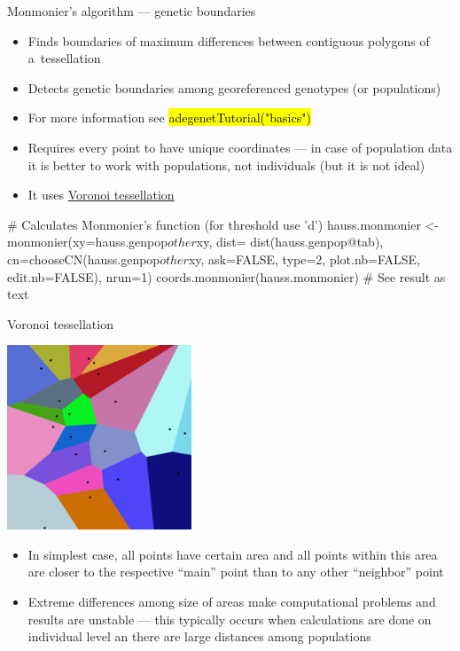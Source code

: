 \documentclass[compress, ucs, xelatex, 11pt, xcolor=svgnames,
	hyperref={
		bookmarks=true,
		unicode=true,
		colorlinks=true,
		pdftitle={Molecular data in R},
		plainpages=false,
		pdfauthor={Vojtech Zeisek},
		pdfsubject={Course about phylogeny and evolution in R},
		pdfcreator={XeLaTeX},
		pdfkeywords={R, evolution, phylogeny, molecular data},
		linkcolor=Tomato,
		anchorcolor=SaddleBrown,
		citecolor=Goldenrod,
		filecolor=DarkMagenta,
		menucolor=Sienna,
		urlcolor=DarkTurquoise,
		pdftex},
	url={hyphens, lowtilde} %
	]{beamer}
\renewcommand{\texttt}[1]{\hl{\ttfamily #1}}
\begin{document}
\begin{frame}[fragile]{Monmonier's algorithm --- genetic boundaries}
	\begin{itemize}
		\item Finds boundaries of maximum differences between contiguous polygons of a~tessellation
		\item Detects genetic boundaries among georeferenced genotypes (or populations)
		\item For more information see \texttt{adegenetTutorial("basics")}
		\item Requires every point to have unique coordinates --- in case of population data it is better to work with populations, not individuals (but it is not ideal)
		\item It uses \href{https://en.wikipedia.org/wiki/Voronoi_diagram}{Voronoi tessellation}
	\end{itemize}
	\begin{spluscode}
    # Calculates Monmonier's function (for threshold use 'd')
    hauss.monmonier <- monmonier(xy=hauss.genpop$other$xy, dist=
      dist(hauss.genpop@tab), cn=chooseCN(hauss.genpop$other$xy,
      ask=FALSE, type=2, plot.nb=FALSE, edit.nb=FALSE), nrun=1)
    coords.monmonier(hauss.monmonier) # See result as text
	\end{spluscode}
\end{frame}

\begin{frame}{Voronoi tessellation}
	\begin{multicols}{2}
		\includegraphics[height=5.5cm]{voronoi_diagram.png}
		\begin{itemize}
			\item In simplest case, all points have certain area and all points within this area are closer to the respective ``main'' point than to any other ``neighbor'' point
			\item Extreme differences among size of areas make computational problems and results are unstable --- this typically occurs when calculations are done on individual level an there are large distances among populations
		\end{itemize}
	\end{multicols}
\end{frame}
\end{document}
